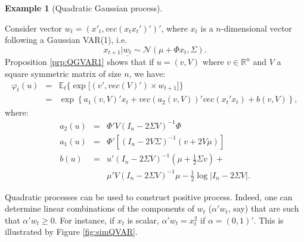 \documentclass[
  12pt,
]{book}
\theoremstyle{definition}
\theoremstyle{definition}
\newtheorem{example}{Example}[chapter]
\theoremstyle{definition}
\theoremstyle{definition}
\theoremstyle{remark}
\begin{document}
\begin{example}[Quadratic Gaussian process]
\protect\hypertarget{exm:QGVAR1}{}\label{exm:QGVAR1}

Consider vector \(w_t = (x'_t,vec(x_t x_t')')'\), where \(x_t\) is a \(n\)-dimensional vector following a Gaussian VAR(1), i.e.
\[
x_{t+1}|\underline{w_t} \sim \mathcal{N}(\mu+\Phi x_t, \Sigma).
\]
Proposition \ref{prp:QGVAR1} shows that if \(u = (v,V)\) where \(v \in \mathbb{R}^n\) and \(V\) a square symmetric matrix of size \(n\), we have:
\begin{eqnarray*}
\varphi_t(u) &=& \mathbb{E}_t\big\{\exp\big[(v',vec(V)')\times w_{t+1}\big]\big\} \\
& =& \exp \left\{a_1(v,V)'x_t +vec(a_2(v,V))' vec(x_t'x_t) + b(v,V) \right\},
\end{eqnarray*}
where:
\begin{eqnarray*}
a_2(u) & = & \Phi'V (I_n - 2\Sigma V)^{-1} \Phi \nonumber \\
a_1(u) & = & \Phi'\left[(I_n-2V\Sigma)^{-1}(v+2V\mu)\right] \nonumber \\
b(u) & = & u'(I_n - 2 \Sigma V)^{-1}\left(\mu + \frac{1}{2} \Sigma v\right) +\\
&& \mu'V(I_n - 2 \Sigma V)^{-1}\mu - \frac{1}{2}\log\big|I_n - 2\Sigma V\big|.\label{eq:laplaceZ}
\end{eqnarray*}

Quadratic processes can be used to construct positive process. Indeed, one can determine linear combinations of the components of \(w_t\) (\(\alpha'w_t\), say) that are such that \(\alpha'w_t \ge 0\). For instance, if \(x_t\) is scalar, \(\alpha'w_t = x_t^2\) if \(\alpha = (0,1)'\). This is illustrated by Figure \ref{fig:simQVAR}.


\end{example}
\end{document}
